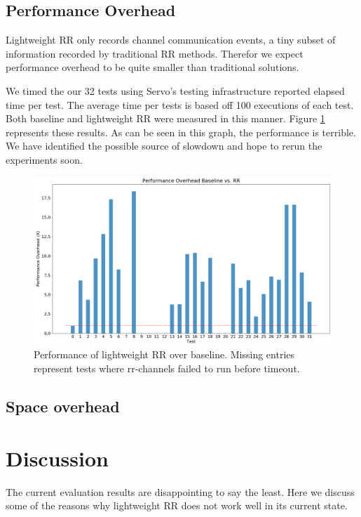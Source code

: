 \documentclass{article}
\begin{document}
\subsection{Performance Overhead}
Lightweight RR only records channel communication events, a tiny subset of information
recorded by traditional RR methods. Therefor we expect performance overhead to be quite
smaller than traditional solutions.

We timed the our 32 tests using Servo's testing infrastructure reported elapsed time
per test. The average time per tests is based off 100 executions of each test. Both
baseline and lightweight RR were measured in this manner. Figure \ref{fig:result_timing}
represents these results. As can be seen in this graph, the performance is terrible.
We have identified the possible source of slowdown and hope to rerun the experiments
soon.

\begin{figure}
  \includegraphics[width=\linewidth]{result_timing.png}
  \caption{Performance of lightweight RR over baseline. Missing entries represent
  tests where rr-channels failed to run before timeout.}
  \label{fig:result_timing}
\end{figure}



\subsection{Space overhead}
\section{Discussion}
\label{sec:discussion}
The current evaluation results are disappointing to say the least. Here we discuss
some of the reasons why lightweight RR does not work well in its current state.
\end{document}
